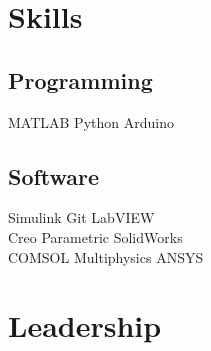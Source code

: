 \documentclass[]{deedy-resume-openfont}
\begin{document}
\begin{minipage}[t]{0.33\textwidth}
%



\section{Skills}

\subsection{Programming}

MATLAB \textbullet{}  Python \textbullet{} Arduino

\sectionsep

\subsection{Software}
Simulink \textbullet{} Git \textbullet{} LabVIEW \textbullet{}\\
Creo Parametric \textbullet{} SolidWorks \textbullet{}\\ 
COMSOL Multiphysics \textbullet{}  ANSYS


\sectionsep %


\section{Leadership}


\end{minipage}
\end{document}

